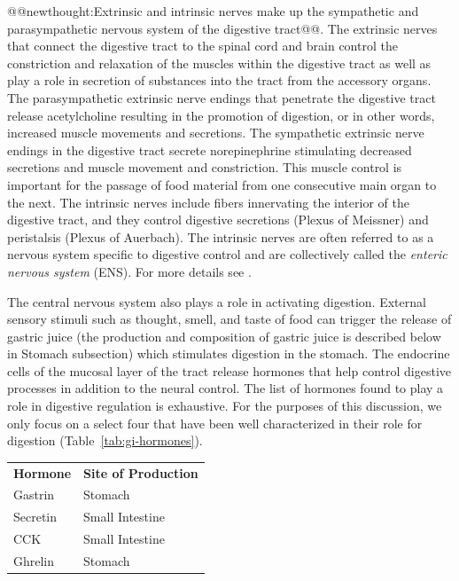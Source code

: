 \documentclass{tufte-handout}
\makeatletter
\def\newthought#1{@@newthought:#1@@}
\makeatother
\begin{document}
\newthought{Extrinsic and intrinsic nerves make up the sympathetic and parasympathetic nervous system of the digestive tract}. The extrinsic nerves that connect the digestive tract to the spinal cord and brain control the constriction and relaxation of the muscles within the digestive tract as well as play a role in secretion of substances into the tract from the accessory organs. The parasympathetic extrinsic nerve endings that penetrate the digestive tract release acetylcholine resulting in the promotion of digestion, or in other words, increased muscle movements and secretions. The sympathetic extrinsic nerve endings in the digestive tract secrete norepinephrine stimulating decreased secretions and muscle movement and constriction. This muscle control is important for the passage of food material from one consecutive main organ to the next. The intrinsic nerves include fibers innervating the interior of the digestive tract, and they control digestive secretions (Plexus of Meissner) and peristalsis (Plexus of Auerbach). The intrinsic nerves are often referred to as a nervous system specific to digestive control and are collectively called the \emph{enteric nervous system} (ENS).  For more details see \citet{Furness2012}.

The central nervous system also plays a role in activating digestion. External sensory stimuli such as thought, smell, and taste of food can trigger the release of gastric juice (the production and composition of gastric juice is described below in Stomach subsection) which stimulates digestion in the stomach. The endocrine cells of the mucosal layer of the tract release hormones that help control digestive processes in addition to the neural control. The  list of hormones found to play a role in digestive regulation is exhaustive. For the purposes of this discussion, we only focus on a select four that have been well characterized in their role for digestion (Table~\ref{tab:gi-hormones}). 

\begin{margintable}
\caption{Sites of production of key digestive hormones}\label{tab:gi-hormones}
\begin{tabular}{ll}
\textbf{Hormone} & \textbf{Site of Production} \\
Gastrin          & Stomach                     \\
Secretin         & Small Intestine             \\
CCK              & Small Intestine             \\
Ghrelin          & Stomach                    
\end{tabular}
\end{margintable}
\end{document}
